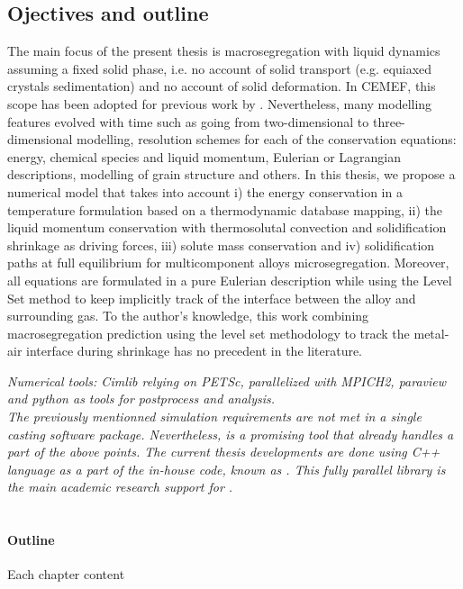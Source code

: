 \subsection{Ojectives and outline}
%
The main focus of the present thesis is macrosegregation with liquid dynamics assuming a fixed solid phase, i.e. no account of solid 
transport (e.g. equiaxed crystals sedimentation) and no account of solid deformation. In CEMEF, this scope has been adopted for previous 
work by \citet{gouttebroze_modelisation_2005, liu_finite_2005, mosbah_multiple_2008, rivaux_simulation_2011, carozzani_developpement_2012}.
Nevertheless, many modelling features evolved with time such as going from two-dimensional to three-dimensional modelling, resolution schemes
for each of the conservation equations: energy, chemical species and liquid momentum, Eulerian or Lagrangian descriptions, modelling of grain structure and others.
In this thesis, we propose a numerical model that takes into account 
i) the energy conservation in a temperature formulation based on a thermodynamic database mapping,
ii) the liquid momentum conservation with thermosolutal convection and solidification shrinkage as driving forces, 
iii) solute mass conservation and 
iv) solidification paths at full equilibrium for multicomponent alloys microsegregation. 
Moreover, all equations are formulated in a pure Eulerian description while using the Level Set method to keep implicitly track of the interface between the alloy and surrounding gas. To the author's knowledge, this work combining macrosegregation prediction using the level set methodology to track the metal-air interface during shrinkage has no precedent in the literature.

\emph{Numerical tools: Cimlib relying on PETSc, parallelized with MPICH2, paraview and python as tools for postprocess and analysis. \\
The previously mentionned simulation requirements are not met in a single casting software package. Nevertheless, \thercast is a promising tool that already 
handles a part of the above points. The current thesis developments are done using C++ language as a part of the
in-house code, known as \cimlib \citep{digonnet_cimlib:_2007, mesri_advanced_2009}. 
This fully parallel library is the main academic research support for \thercast.\\ \\ }

\paragraph{Outline}
Each chapter content \\ %

